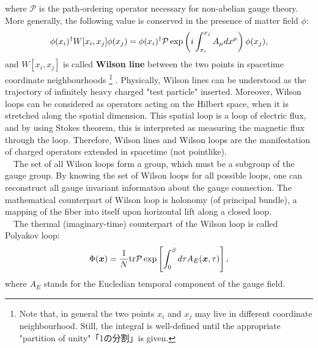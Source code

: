 \documentclass{ltjsarticle}
\theoremstyle{mystyle} %
\numberwithin{equation}{section}
\begin{document}
where $\mathcal{P}$ is the path-ordering operator necessary for non-abelian gauge theory. 
More generally, 
the following value is conserved in the presence of matter field $\phi$:
\begin{align}
    \phi(x_i)^\dagger W[x_i, x_j]\phi(x_j)
     = \phi(x_i)^\dagger\mathcal{P} \exp\left({i\int_{x_i}^{x_j}A_{\mu}dx^\mu}\right)\phi(x_j), 
\end{align}
and $W[x_i, x_j]$ is called \textbf{Wilson line} between the two points in spacetime coordinate neighbourhoods 
\footnote{Note that, in general the two points $x_i$ and $x_j$ may live in different coordinate neighbourhood. 
Still, the integral is well-defined until the appropriate "partition of unity"「1の分割」is given. }
. 
Physically, Wilson lines can be understood as the trajectory of infinitely heavy charged "test particle" inserted. 
Moreover, Wilson loops can be considered as operators acting on the Hilbert space, 
when it is stretched along the spatial dimension. 
This spatial loop is a loop of electric flux, 
and by using Stokes theorem, this is interpreted as measuring the magnetic flux through the loop. 
Therefore, Wilson lines and Wilson loops are the manifestation of charged operators extended in spacetime (not pointlike). 
\\
　The set of all Wilson loops form a group, which must be a subgroup of the gauge group. 
By knowing the set of Wilson loops for all possible loops, 
one can reconstruct all gauge invariant information about the gauge connection. 
The mathematical counterpart of Wilson loop is holonomy (of principal bundle), 
a mapping of the fiber into itself upon horizontal lift along a closed loop. 
\\
　The thermal (imaginary-time) counterpart of the Wilson loop is called Polyakov loop: 
\begin{align}
    \Phi(\bm{x}) = \frac{1}{N}\mathrm{tr}\mathcal{P}\exp\left[{\int_{0}^{\beta}d\tau A_E(\bm{x}, \tau)}\right], 
\end{align}
where $A_{E}$ stands for the Eucledian temporal component of the gauge field. 
\end{document}
